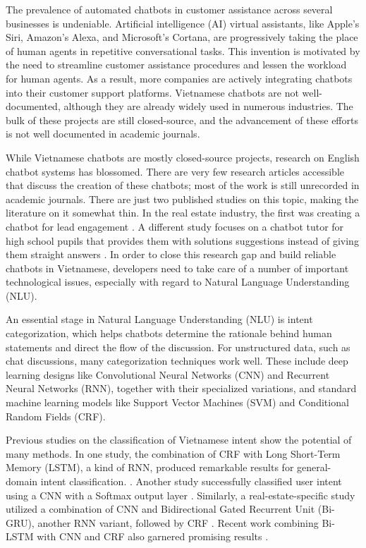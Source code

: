 \documentclass[conference]{IEEEtran}
\begin{document}
  The prevalence of automated chatbots in customer assistance across several businesses is undeniable. Artificial intelligence (AI) virtual assistants, like Apple's Siri, Amazon's Alexa, and Microsoft's Cortana, are progressively taking the place of human agents in repetitive conversational tasks. This invention is motivated by the need to streamline customer assistance procedures and lessen the workload for human agents. As a result, more companies are actively integrating chatbots into their customer support platforms. Vietnamese chatbots are not well-documented, although they are already widely used in numerous industries. The bulk of these projects are still closed-source, and the advancement of these efforts is not well documented in academic journals.
    
While Vietnamese chatbots are mostly closed-source projects, research on English chatbot systems has blossomed.  There are very few research articles accessible that discuss the creation of these chatbots; most of the work is still unrecorded in academic journals. There are just two published studies on this topic, making the literature on it somewhat thin. In the real estate industry, the first was creating a chatbot for lead engagement \cite{quan2018lead}. A different study focuses on a chatbot tutor for high school pupils that provides them with solutions suggestions instead of giving them straight answers \cite{nguyen2020design}. In order to close this research gap and build reliable chatbots in Vietnamese, developers need to take care of a number of important technological issues, especially with regard to Natural Language Understanding (NLU).
    
   An essential stage in Natural Language Understanding (NLU) is intent categorization, which helps chatbots determine the rationale behind human statements and direct the flow of the discussion. For unstructured data, such as chat discussions, many categorization techniques work well. These include deep learning designs like Convolutional Neural Networks (CNN) and Recurrent Neural Networks (RNN), together with their specialized variations, and standard machine learning models like Support Vector Machines (SVM) and Conditional Random Fields (CRF).
    
    Previous studies on the classification of Vietnamese intent show the potential of many methods. In one study, the combination of CRF with Long Short-Term Memory (LSTM), a kind of RNN, produced remarkable results for general-domain intent classification. \cite{luong2017intent}. Another study successfully classified user intent using a CNN with a Softmax output layer \cite{ngo2017identification}. Similarly, a real-estate-specific study utilized a combination of CNN and Bidirectional Gated Recurrent Unit (Bi-GRU), another RNN variant, followed by CRF \cite{quan2018lead}. Recent work combining Bi-LSTM with CNN and CRF also garnered promising results \cite{tran2020understanding}.
    
\end{document}

